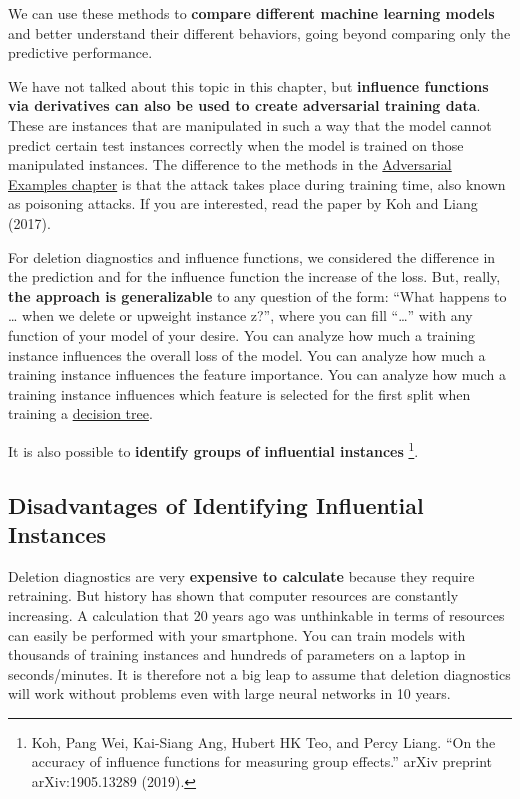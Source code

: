 \documentclass[
  11pt,
]{scrbook}
\begin{document}
We can use these methods to \textbf{compare different machine learning models} and better understand their different behaviors, going beyond comparing only the predictive performance.

We have not talked about this topic in this chapter, but \textbf{influence functions via derivatives can also be used to create adversarial training data}.
These are instances that are manipulated in such a way that the model cannot predict certain test instances correctly when the model is trained on those manipulated instances.
The difference to the methods in the \protect\hyperlink{adversarial}{Adversarial Examples chapter} is that the attack takes place during training time, also known as poisoning attacks.
If you are interested, read the paper by Koh and Liang (2017).

For deletion diagnostics and influence functions, we considered the difference in the prediction and for the influence function the increase of the loss.
But, really, \textbf{the approach is generalizable} to any question of the form:
``What happens to \ldots{} when we delete or upweight instance z?'', where you can fill ``\ldots{}'' with any function of your model of your desire.
You can analyze how much a training instance influences the overall loss of the model.
You can analyze how much a training instance influences the feature importance.
You can analyze how much a training instance influences which feature is selected for the first split when training a \protect\hyperlink{tree}{decision tree}.

It is also possible to \textbf{identify groups of influential instances} \footnote{Koh, Pang Wei, Kai-Siang Ang, Hubert HK Teo, and Percy Liang. ``On the accuracy of influence functions for measuring group effects.'' arXiv preprint arXiv:1905.13289 (2019).}.

\hypertarget{disadvantages-of-identifying-influential-instances}{%
\subsection{Disadvantages of Identifying Influential Instances}\label{disadvantages-of-identifying-influential-instances}}

Deletion diagnostics are very \textbf{expensive to calculate} because they require retraining.
But history has shown that computer resources are constantly increasing.
A calculation that 20 years ago was unthinkable in terms of resources can easily be performed with your smartphone.
You can train models with thousands of training instances and hundreds of parameters on a laptop in seconds/minutes.
It is therefore not a big leap to assume that deletion diagnostics will work without problems even with large neural networks in 10 years.
\end{document}
